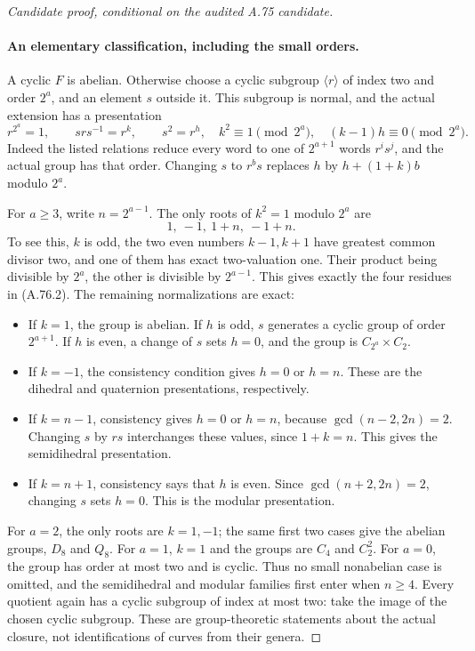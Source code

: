 \begin{proof}[Candidate proof, conditional on the audited A.75 candidate]
\paragraph{An elementary classification, including the small orders.}
A cyclic \(F\) is abelian. Otherwise choose a cyclic
subgroup \(\langle r\rangle\) of index two and order
\(2^a\), and an element \(s\) outside it. This subgroup
is normal, and the actual extension has a presentation
\[
 r^{2^a}=1,\qquad srs^{-1}=r^k,\qquad s^2=r^h,
 \quad k^2\equiv1\pmod{2^a},\quad (k-1)h\equiv0\pmod{2^a}.
                                                        \tag{A.76.1}
\]
Indeed the listed relations reduce every word to one of
\(2^{a+1}\) words \(r^i s^j\), and the actual group
has that order. Changing \(s\) to \(r^b s\) replaces
\(h\) by \(h+(1+k)b\) modulo \(2^a\).

For \(a\ge3\), write \(n=2^{a-1}\). The only roots
of \(k^2=1\) modulo \(2^a\) are
\[
                         1,\ -1,\ 1+n,\ -1+n.
                                                        \tag{A.76.2}
\]
To see this, \(k\) is odd, the two even numbers \(k-1,k+1\)
have greatest common divisor two, and one of them has
exact two-valuation one. Their product being divisible
by \(2^a\), the other is divisible by \(2^{a-1}\).
This gives exactly the four residues in (A.76.2).
The remaining normalizations are exact:
\begin{itemize}
\item If \(k=1\), the group is abelian. If \(h\) is odd,
\(s\) generates a cyclic group of order \(2^{a+1}\).
If \(h\) is even, a change of \(s\) sets \(h=0\),
and the group is \(C_{2^a}\times C_2\).
\item If \(k=-1\), the consistency condition gives
\(h=0\) or \(h=n\). These are the dihedral and
quaternion presentations, respectively.
\item If \(k=n-1\), consistency gives \(h=0\) or
\(h=n\), because \(\gcd(n-2,2n)=2\). Changing
\(s\) by \(rs\) interchanges these values, since
\(1+k=n\). This gives the semidihedral presentation.
\item If \(k=n+1\), consistency says that \(h\)
is even. Since \(\gcd(n+2,2n)=2\), changing \(s\)
sets \(h=0\). This is the modular presentation.
\end{itemize}

For \(a=2\), the only roots are \(k=1,-1\); the
same first two cases give the abelian groups, \(D_8\)
and \(Q_8\). For \(a=1\), \(k=1\) and the groups
are \(C_4\) and \(C_2^2\). For \(a=0\), the group
has order at most two and is cyclic. Thus no small
nonabelian case is omitted, and the semidihedral and
modular families first enter when \(n\ge4\).
Every quotient again has a cyclic subgroup of index at
most two: take the image of the chosen cyclic subgroup.
These are group-theoretic statements about the actual
closure, not identifications of curves from their genera.


\end{proof}
